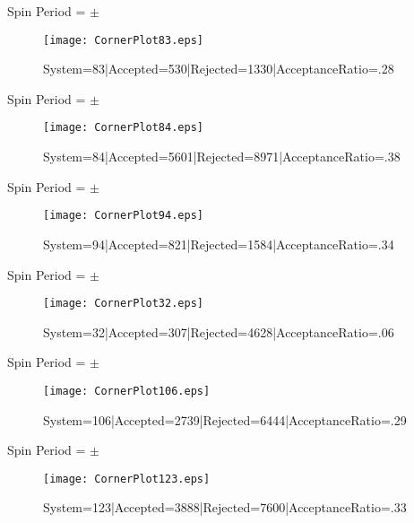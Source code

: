 \documentclass[10pt]{article}
\begin{document}
\begin{center}
        Spin Period = $\pm$ 
\begin{figure}[h] 
        \texttt{[image: CornerPlot83.eps]}
        \caption{System=83|Accepted=530|Rejected=1330|AcceptanceRatio=.28}
        \label{S83}
        \centering
        \end{figure}
        \end{center}
\begin{center}
        Spin Period = $\pm$ 
\begin{figure}[h] 
        \texttt{[image: CornerPlot84.eps]}
        \caption{System=84|Accepted=5601|Rejected=8971|AcceptanceRatio=.38}
        \label{S84}
        \centering
        \end{figure}
        \end{center}
\begin{center}
        Spin Period = $\pm$ 
\begin{figure}[h] 
        \texttt{[image: CornerPlot94.eps]}
        \caption{System=94|Accepted=821|Rejected=1584|AcceptanceRatio=.34}
        \label{S94}
        \centering
        \end{figure}
        \end{center}
\begin{center}
        Spin Period = $\pm$ 
\begin{figure}[h] 
        \texttt{[image: CornerPlot32.eps]}
        \caption{System=32|Accepted=307|Rejected=4628|AcceptanceRatio=.06}
        \label{S32}
        \centering
        \end{figure}
        \end{center}
\begin{center}
        Spin Period = $\pm$ 
\begin{figure}[h] 
        \texttt{[image: CornerPlot106.eps]}
        \caption{System=106|Accepted=2739|Rejected=6444|AcceptanceRatio=.29}
        \label{S106}
        \centering
        \end{figure}
        \end{center}
\begin{center}
        Spin Period = $\pm$ 
\begin{figure}[h] 
        \texttt{[image: CornerPlot123.eps]}
        \caption{System=123|Accepted=3888|Rejected=7600|AcceptanceRatio=.33}
        \label{S123}
        \centering
        \end{figure}
        \end{center}
\end{document}
